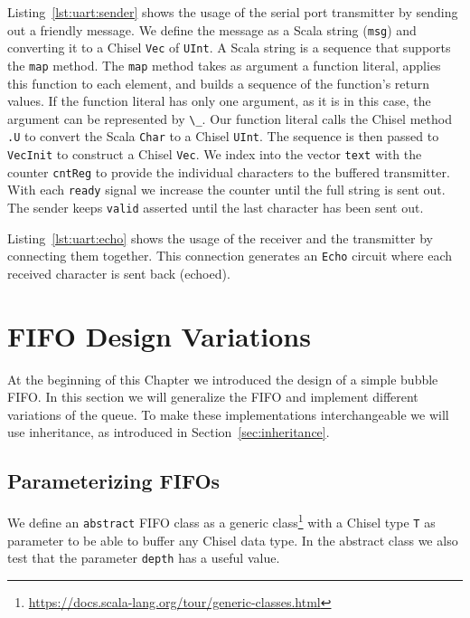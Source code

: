 \documentclass[%
    10pt,
    headinclude, footexclude,
    openright, %
    notitlepage,
    cleardoubleempty,
    headsepline,
    pointlessnumbers,
    bibtotoc, idxtotoc,
    ]{scrbook}
\newcommand{\code}[1]{{\lstinline[basicstyle=\small\ttfamily]{#1}}}
\newcommand{\myref}[2]{\href{#1}{#2}}
\renewcommand{\myref}[2]{{#2}{\footnote{\url{#1}}}}
\begin{document}

Listing~\ref{lst:uart:sender} shows the usage of the serial port transmitter
by sending out a friendly message. We define the message as a Scala
string (\code{msg}) and converting it to a Chisel \code{Vec} of \code{UInt}.
A Scala string is a sequence that supports the \code{map} method.
The \code{map} method takes as argument a function literal, applies this function to
each element, and builds a sequence of the function's return values.
If the function literal has only one argument, as it is in this case, the
argument can be represented by \code{\_}. Our function literal calls
the Chisel method \code{.U} to convert the Scala \code{Char} to a Chisel
\code{UInt}. The sequence is then passed to \code{VecInit} to construct
a Chisel \code{Vec}. We index into the vector \code{text} with the counter
\code{cntReg} to provide the individual characters to the buffered transmitter.
With each \code{ready} signal we increase the counter until the full string
is sent out. The sender keeps \code{valid} asserted until the last character
has been sent out.


Listing~\ref{lst:uart:echo} shows the usage of the receiver and the transmitter
by connecting them together. This connection generates an \code{Echo} circuit where each
received character is sent back (echoed).

\section{FIFO Design Variations}
\label{sec:more:fifo}

At the beginning of this Chapter we introduced the design of a simple bubble FIFO.
In this section we will generalize the FIFO and implement different variations of the queue.
To make these implementations interchangeable we will use inheritance,
as introduced in Section~\ref{sec:inheritance}.

\subsection{Parameterizing FIFOs}

We define an \code{abstract}
FIFO class as a \myref{https://docs.scala-lang.org/tour/generic-classes.html}{generic class}
with a Chisel type \code{T} as parameter to be able to buffer
any Chisel data type. In the abstract class we also test that the
parameter \code{depth} has a useful value.
\end{document}
